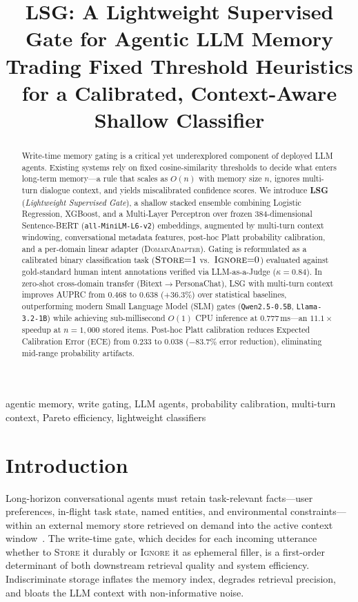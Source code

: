 \documentclass[journal]{IEEEtran}
\title{LSG: A Lightweight Supervised Gate for Agentic LLM Memory\\
{\large Trading Fixed Threshold Heuristics for a Calibrated, Context-Aware Shallow Classifier}}
\author{
  \IEEEauthorblockN{Shlok Chorge}
  \IEEEauthorblockA{
    Department of Information Technology\\
    Vidyalankar Polytechnic and Padmabhushan Vasantdada\\
    Patil College of Engineering (VPPCOE)\\
    University of Mumbai, Mumbai, India\\
    \texttt{shlokchorge2929@gmail.com}
  }
  \and
  \IEEEauthorblockN{Prithibe Majumder}
  \IEEEauthorblockA{\texttt{majumderprithibe@gmail.com}}
}
\begin{document}
\maketitle

\begin{abstract}
Write-time memory gating is a critical yet underexplored component of deployed LLM agents.
Existing systems rely on fixed cosine-similarity thresholds to decide what enters long-term memory---a rule that scales as $O(n)$ with memory size $n$, ignores multi-turn dialogue context, and yields miscalibrated confidence scores.
We introduce \textbf{LSG} (\emph{Lightweight Supervised Gate}), a shallow stacked ensemble combining Logistic Regression, XGBoost, and a Multi-Layer Perceptron over frozen 384-dimensional Sentence-BERT (\texttt{all-MiniLM-L6-v2}) embeddings, augmented by multi-turn context windowing, conversational metadata features, post-hoc Platt probability calibration, and a per-domain linear adapter (\textsc{DomainAdapter}).
Gating is reformulated as a calibrated binary classification task ($\textsc{Store}{=}1$ vs.\ $\textsc{Ignore}{=}0$) evaluated against gold-standard human intent annotations verified via LLM-as-a-Judge ($\kappa{=}0.84$).
In zero-shot cross-domain transfer (Bitext$\to$PersonaChat), LSG with multi-turn context improves AUPRC from $0.468$ to $0.638$ ($+36.3\%$) over statistical baselines, outperforming modern Small Language Model (SLM) gates (\texttt{Qwen2.5-0.5B}, \texttt{Llama-3.2-1B}) while achieving sub-millisecond $O(1)$ CPU inference at $0.777$\,ms---an $11.1{\times}$ speedup at $n{=}1{,}000$ stored items.
Post-hoc Platt calibration reduces Expected Calibration Error (ECE) from $0.233$ to $0.038$ ($-83.7\%$ error reduction), eliminating mid-range probability artifacts.
\end{abstract}

\begin{IEEEkeywords}
agentic memory, write gating, LLM agents, probability calibration, multi-turn context, Pareto efficiency, lightweight classifiers
\end{IEEEkeywords}

\section{Introduction}

Long-horizon conversational agents must retain task-relevant facts---user preferences, in-flight task state, named entities, and environmental constraints---within an external memory store retrieved on demand into the active context window~\cite{packer2023memgpt,mem0_2025,xu2025amem}.
The write-time gate, which decides for each incoming utterance whether to \textsc{Store} it durably or \textsc{Ignore} it as ephemeral filler, is a first-order determinant of both downstream retrieval quality and system efficiency.
Indiscriminate storage inflates the memory index, degrades retrieval precision, and bloats the LLM context with non-informative noise.
\end{document}
